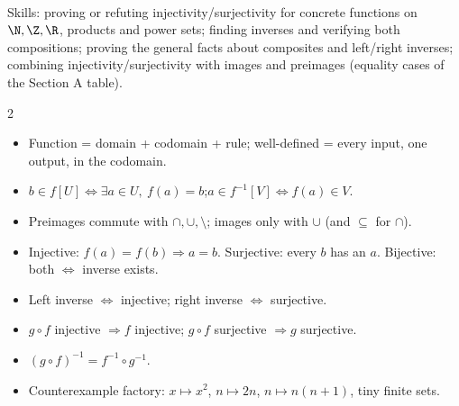\begin{planning}
\quad {}\\[3pt]
Skills: proving or refuting injectivity/surjectivity for concrete functions on $\N,\Z,\R$, products and power sets; finding inverses and verifying both compositions; proving the general facts about composites and left/right inverses; combining injectivity/surjectivity with images and preimages (equality cases of the Section A table).
\end{planning}


\begin{multicols}{2}\small
\begin{itemize}
\item Function = domain + codomain + rule; well-defined = every input, one output, in the codomain.
\item $b\in f[U]\Leftrightarrow\exists a\in U,\ f(a)=b$;\quad $a\in f^{-1}[V]\Leftrightarrow f(a)\in V$.
\item Preimages commute with $\cap,\cup,\setminus$; images only with $\cup$ (and $\subseteq$ for $\cap$).
\item Injective: $f(a)=f(b)\Rightarrow a=b$. Surjective: every $b$ has an $a$. Bijective: both $\Leftrightarrow$ inverse exists.
\item Left inverse $\Leftrightarrow$ injective; right inverse $\Leftrightarrow$ surjective.
\item $g\circ f$ injective $\Rightarrow f$ injective; $g\circ f$ surjective $\Rightarrow g$ surjective.
\item $(g\circ f)^{-1}=f^{-1}\circ g^{-1}$.
\item Counterexample factory: $x\mapsto x^2$, $n\mapsto 2n$, $n\mapsto n(n+1)$, tiny finite sets.
\end{itemize}
\end{multicols}
